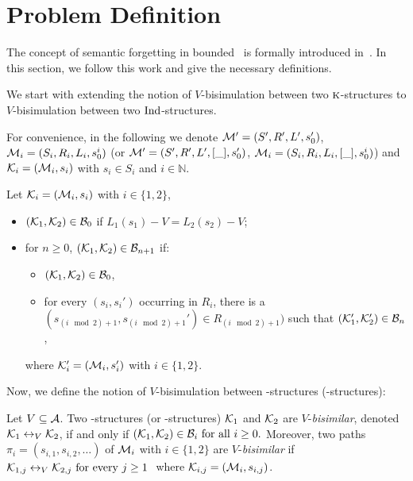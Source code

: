\documentclass[letterpaper]{article} %
\begin{document}
\section{Problem Definition}\label{problem}
The concept of semantic forgetting in bounded \CTL\ is formally introduced  in~\cite{renyansfirstpaper}. In this section, we follow this work and give  the necessary definitions. 

We start with extending the notion of $V$-bisimulation between two $\textsc{k}$-structures to $V$-bisimulation between two $\textrm{Ind}$-structures. 


For convenience, in the following we denote
${\cal M}'=(S',R',L',s_0')$, ${\cal M}_i=(S_i, R_i,L_i, s_0^i)$ (or 
${\cal M}'=(S',R',L', [\_],s_0')$, ${\cal M}_i=(S_i, R_i,L_i, [\_], s_0^i)$) and ${\cal K}_i=({\cal M}_i, s_i)$ with $s_i \in S_i$
and $i \in \mathbb{N}$.

Let
${\cal K}_i=({\cal M}_i,s_i)$ with $i\in\{1,2\}$,
\begin{itemize}
  \item $({\cal K}_1,{\cal K}_2)\in{\cal B}_0$ if $L_1(s_1)- V=L_2(s_2)- V$;  %
  \item for $n\ge 0$, $({\cal K}_1,{\cal K}_2)\in{\cal B}_{n+1}$ if:
  \begin{itemize}
    \item $({\cal K}_1,{\cal K}_2)\in{\cal B}_0$,
    \item for every $(s_i,s_i')$ occurring in $R_i$, there is a $(s_{(i \mod 2)+1}, s_{(i \mod 2)+1}')\in R_{(i \mod 2)+1})$
    such that $({\cal K}_1',{\cal K}_2')\in {\cal B}_n$,
  \end{itemize}
  where ${\cal K}_i'=({\cal M}_i,s_i')$ with $i\in\{1,2\}$.
\end{itemize}

Now, we define the notion of $V$-bisimulation between \MPK-structures (\Ind-structures):
\begin{definition}[$V$-bisimulation] %
  \label{def:V-bisimulation}
   Let $V\subseteq\cal A$. Two \MPK-structures (or \Ind-structures) ${\cal K}_1$ and ${\cal K}_2$ are $V$-{\em bisimilar},  denoted ${\cal K}_1 \leftrightarrow_V {\cal K}_2$, 
 if and only if $({\cal K}_1,{\cal K}_2)\in {{\cal B}_i}\mbox{ for all }i\ge 0.$ Moreover, two paths $\pi_i=(s_{i,1},s_{i,2},\ldots)$ of ${\cal M}_i$ with $i\in \{1,2\}$
 are $V$-{\em bisimilar} if
$ {\cal K}_{1,j} \leftrightarrow_V {\cal K}_{2,j}\mbox { for every $j\ge 1$ }$
 where ${\cal K}_{i,j}=({\cal M}_i,s_{i,j})$.
\end{definition}
\end{document}
